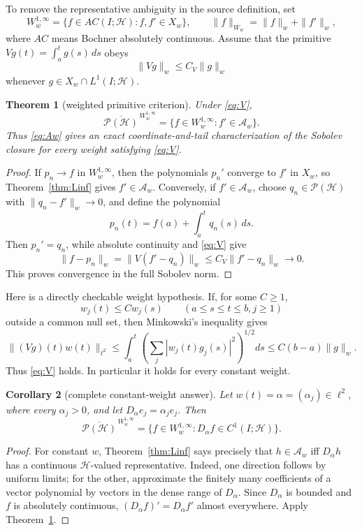 \documentclass[11pt]{article}
\newtheorem{theorem}{Theorem}
\newtheorem{corollary}[theorem]{Corollary}
\newcommand{\Hh}{\mathcal H}
\newcommand{\Pw}{\mathcal P(\Hh)}
\newcommand{\Aw}{\mathcal A_w}
\begin{document}
To remove the representative ambiguity in the source definition, set
\[
 W_w^{1,\infty}=\{f\in AC(I;\Hh): f,f'\in X_w\},
 \qquad \|f\|_{W_w}=\|f\|_w+\|f'\|_w,
\]
where $AC$ means Bochner absolutely continuous.  Assume that the primitive
$Vg(t)=\int_a^t g(s)\,ds$ obeys
\begin{equation}\label{eq:V}
 \|Vg\|_w\le C_V\|g\|_w
\end{equation}
whenever $g\in X_w\cap L^1(I;\Hh)$.

\begin{theorem}[weighted primitive criterion]\label{thm:Sob}
Under \eqref{eq:V},
\begin{equation}\label{eq:closure}
 \overline{\Pw}^{\,W_w^{1,\infty}}
 =\{f\in W_w^{1,\infty}: f'\in\Aw\}.
\end{equation}
Thus \eqref{eq:Aw} gives an exact coordinate-and-tail characterization of
the Sobolev closure for every weight satisfying \eqref{eq:V}.
\end{theorem}

\begin{proof}
If $p_n\to f$ in $W_w^{1,\infty}$, then the polynomials $p_n'$ converge to
$f'$ in $X_w$, so Theorem~\ref{thm:Linf} gives $f'\in\Aw$.
Conversely, if $f'\in\Aw$, choose $q_n\in\Pw$ with
$\|q_n-f'\|_w\to0$, and define the polynomial
\[
 p_n(t)=f(a)+\int_a^tq_n(s)\,ds.
\]
Then $p_n'=q_n$, while absolute continuity and \eqref{eq:V} give
\[
 \|f-p_n\|_w=\|V(f'-q_n)\|_w
 \le C_V\|f'-q_n\|_w\longrightarrow0.
\]
This proves convergence in the full Sobolev norm.
\end{proof}

Here is a directly checkable weight hypothesis.  If, for some $C\ge1$,
\begin{equation}\label{eq:ratio}
 w_j(t)\le Cw_j(s)\qquad(a\le s\le t\le b, j\ge1)
\end{equation}
outside a common null set, then Minkowski's inequality gives
\[
 \|(Vg)(t)w(t)\|_{\ell^2}
 \le\int_a^t\left(\sum_j|w_j(t)g_j(s)|^2\right)^{1/2}ds
 \le C(b-a)\|g\|_w.
\]
Thus \eqref{eq:V} holds.  In particular it holds for every constant weight.

\begin{corollary}[complete constant-weight answer]\label{cor:constant}
Let $w(t)=\alpha=(\alpha_j)\in\ell^2$, where every $\alpha_j>0$, and let
$D_\alpha e_j=\alpha_je_j$.  Then
\[
 \overline{\Pw}^{\,W_w^{1,\infty}}
 =\{f\in W_w^{1,\infty}:D_\alpha f\in C^1(I;\Hh)\}.
\]
\end{corollary}

\begin{proof}
For constant $w$, Theorem~\ref{thm:Linf} says precisely that
$h\in\Aw$ iff $D_\alpha h$ has a continuous $\Hh$-valued representative.
Indeed, one direction follows by uniform limits; for the other, approximate
the finitely many coefficients of a vector polynomial by vectors in the
dense range of $D_\alpha$.  Since $D_\alpha$ is bounded and $f$ is absolutely
continuous, $(D_\alpha f)'=D_\alpha f'$ almost everywhere.  Apply
Theorem~\ref{thm:Sob}.
\end{proof}
\end{document}
